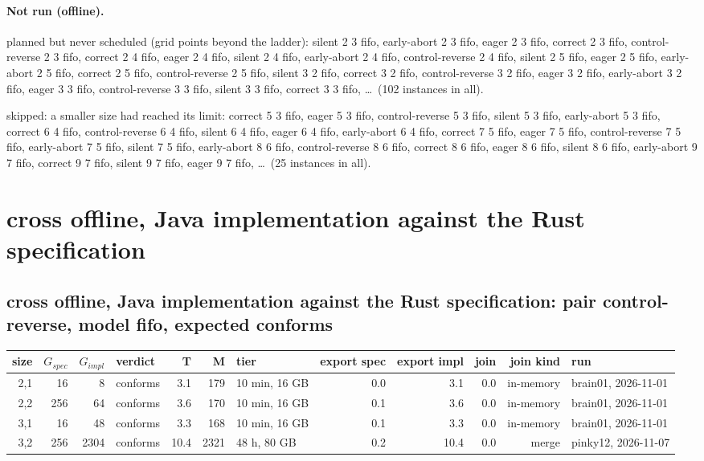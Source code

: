 \documentclass[10pt]{article}
\begin{document}
\paragraph{Not run (offline).}
planned but never scheduled (grid points beyond the ladder): silent 2 3 fifo, early-abort 2 3 fifo, eager 2 3 fifo, correct 2 3 fifo, control-reverse 2 3 fifo, correct 2 4 fifo, eager 2 4 fifo, silent 2 4 fifo, early-abort 2 4 fifo, control-reverse 2 4 fifo, silent 2 5 fifo, eager 2 5 fifo, early-abort 2 5 fifo, correct 2 5 fifo, control-reverse 2 5 fifo, silent 3 2 fifo, correct 3 2 fifo, control-reverse 3 2 fifo, eager 3 2 fifo, early-abort 3 2 fifo, eager 3 3 fifo, control-reverse 3 3 fifo, silent 3 3 fifo, correct 3 3 fifo, \ldots\ (102 instances in all).\par
skipped: a smaller size had reached its limit: correct 5 3 fifo, eager 5 3 fifo, control-reverse 5 3 fifo, silent 5 3 fifo, early-abort 5 3 fifo, correct 6 4 fifo, control-reverse 6 4 fifo, silent 6 4 fifo, eager 6 4 fifo, early-abort 6 4 fifo, correct 7 5 fifo, eager 7 5 fifo, control-reverse 7 5 fifo, early-abort 7 5 fifo, silent 7 5 fifo, early-abort 8 6 fifo, control-reverse 8 6 fifo, correct 8 6 fifo, eager 8 6 fifo, silent 8 6 fifo, early-abort 9 7 fifo, correct 9 7 fifo, silent 9 7 fifo, eager 9 7 fifo, \ldots\ (25 instances in all).\par
\section*{cross offline, Java implementation against the Rust specification}
\subsection*{cross offline, Java implementation against the Rust specification: pair \textsf{control-reverse}, model fifo, expected conforms}
\begin{longtable}{@{}rrrlrrlrrrrl@{}}
\toprule
size & $G_{\mathit{spec}}$ & $G_{\mathit{impl}}$ & verdict & T & M & tier & export spec & export impl & join & join kind & run \\
\midrule
\endhead
\color{red} 2,1 & 16 & 8 & conforms & 3.1 & 179 & 10 min, 16 GB & 0.0 & 3.1 & 0.0 & in-memory & brain01, 2026-11-01 \\
\color{red} 2,2 & 256 & 64 & conforms & 3.6 & 170 & 10 min, 16 GB & 0.1 & 3.6 & 0.0 & in-memory & brain01, 2026-11-01 \\
\color{red} 3,1 & 16 & 48 & conforms & 3.3 & 168 & 10 min, 16 GB & 0.1 & 3.3 & 0.0 & in-memory & brain01, 2026-11-01 \\
\color{red} 3,2 & 256 & 2304 & conforms & 10.4 & 2321 & 48 h, 80 GB & 0.2 & 10.4 & 0.0 & merge & pinky12, 2026-11-07 \\
\bottomrule
\end{longtable}
\end{document}
